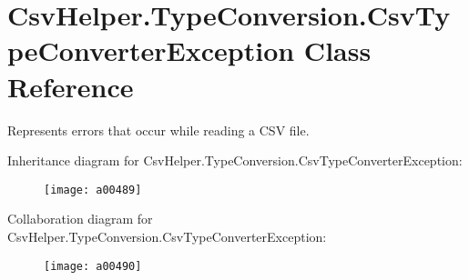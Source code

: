 \hypertarget{a00077}{\section{Csv\-Helper.\-Type\-Conversion.\-Csv\-Type\-Converter\-Exception Class Reference}
\label{a00077}
}


Represents errors that occur while reading a C\-S\-V file.  




Inheritance diagram for Csv\-Helper.\-Type\-Conversion.\-Csv\-Type\-Converter\-Exception\-:
\nopagebreak
\begin{figure}[H]
\begin{center}
\leavevmode
\texttt{[image: a00489]}
\end{center}
\end{figure}


Collaboration diagram for Csv\-Helper.\-Type\-Conversion.\-Csv\-Type\-Converter\-Exception\-:
\nopagebreak
\begin{figure}[H]
\begin{center}
\leavevmode
\texttt{[image: a00490]}
\end{center}
\end{figure}
